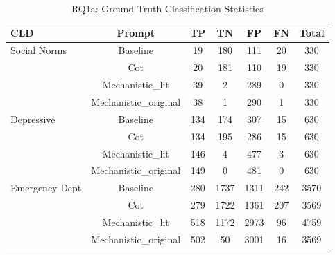 \begin{table}[htbp]
\centering
\caption{RQ1a: Ground Truth Classification Statistics}
\label{tab:rq1a_gt_classification}
\begin{tabular}{lcccccc}
\toprule
\textbf{CLD} & \textbf{Prompt} & \textbf{TP} & \textbf{TN} & \textbf{FP} & \textbf{FN} & \textbf{Total} \\
\midrule
Social Norms & Baseline & 19 & 180 & 111 & 20 & 330 \\
 & Cot & 20 & 181 & 110 & 19 & 330 \\
 & Mechanistic_lit & 39 & 2 & 289 & 0 & 330 \\
 & Mechanistic_original & 38 & 1 & 290 & 1 & 330 \\
\midrule
Depressive & Baseline & 134 & 174 & 307 & 15 & 630 \\
 & Cot & 134 & 195 & 286 & 15 & 630 \\
 & Mechanistic_lit & 146 & 4 & 477 & 3 & 630 \\
 & Mechanistic_original & 149 & 0 & 481 & 0 & 630 \\
\midrule
Emergency Dept & Baseline & 280 & 1737 & 1311 & 242 & 3570 \\
 & Cot & 279 & 1722 & 1361 & 207 & 3569 \\
 & Mechanistic_lit & 518 & 1172 & 2973 & 96 & 4759 \\
 & Mechanistic_original & 502 & 50 & 3001 & 16 & 3569 \\
\midrule
\bottomrule
\end{tabular}
\end{table}
